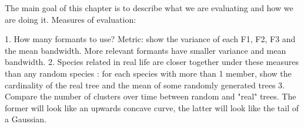 \documentclass[../main.tex]{subfiles}
\begin{document}
 \label{chapter_results}
The main goal of this chapter is to describe what we are evaluating and how we are doing it. Measures of evaluation:

1. How many formants to use? Metric: show the variance of each F1, F2, F3 and the mean bandwidth. More relevant formants have smaller variance and mean bandwidth.
2. Species related in real life are closer together under these measures than any random species : for each species with more than 1 member, show the cardinality of the real tree and the mean of some randomly generated trees
3. Compare the number of clusters over time between random and "real" trees. The former will look like an upwards concave curve, the latter will look like the tail of a Gaussian.
\end{document}
